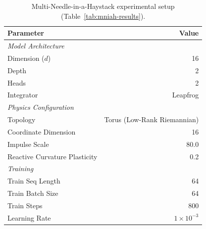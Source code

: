 \documentclass[12pt,a4paper]{article}
\begin{document}
\begin{table}[H]
    \centering
    \setlength{\tabcolsep}{10pt}
    \setlength{\extrarowheight}{3pt}
    \caption{Multi-Needle-in-a-Haystack experimental setup (Table~\ref{tab:mniah-results}).}
    \label{tab:gfn-mniah-config}
    \begin{tabular}{p{5.5cm}r}
        \toprule
        \textbf{Parameter} & \textbf{Value} \\
        \midrule
        \textit{Model Architecture} & \\
        \hspace{4pt}Dimension ($d$) & 16 \\
        \hspace{4pt}Depth & 2 \\
        \hspace{4pt}Heads & 2 \\
        \hspace{4pt}Integrator & Leapfrog \\
        \midrule
        \textit{Physics Configuration} & \\
        \hspace{4pt}Topology & Torus (Low-Rank Riemannian) \\
        \hspace{4pt}Coordinate Dimension & 16 \\
        \hspace{4pt}Impulse Scale & 80.0 \\
        \hspace{4pt}Reactive Curvature Plasticity & 0.2 \\
        \midrule
        \textit{Training} & \\
        \hspace{4pt}Train Seq Length & 64 \\
        \hspace{4pt}Train Batch Size & 64 \\
        \hspace{4pt}Train Steps & 800 \\
        \hspace{4pt}Learning Rate & $1 \times 10^{-3}$ \\
        \bottomrule
    \end{tabular}
\end{table}
\end{document}
